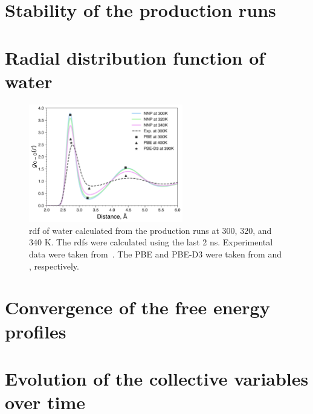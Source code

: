 \clearpage
\section{Stability of the production runs}



\clearpage
\section{Radial distribution function of water}

\begin{figure}[ht]
    \centering
    \includegraphics[width=0.6\textwidth]{Figures/4_Results/results_water_rdf.png}
    \caption{\ac{rdf} of water calculated from the production runs at 300, 320, and 340 K. The \acp{rdf} were calculated using the last 2 ns. Experimental data were taken from~\citep{soperRadialDistributionFunctions2013}. The PBE and PBE-D3 were taken from \citep{phamStructureDynamicsAqueous2016} and \citep{zhouQuantifyingStructureWater2022}, respectively.}
    \label{fig:water_rdf}
\end{figure}


\section{Convergence of the free energy profiles}




\section{Evolution of the collective variables over time}



